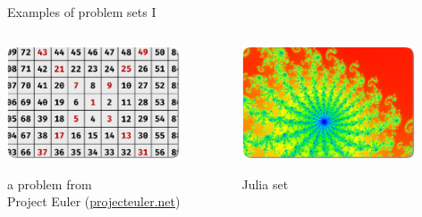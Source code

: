 \documentclass[svgnames]{beamer}
\begin{document}
\begin{frame}{Examples of problem sets I}

 \vspace{-0.7truecm}
 \begin{columns}[t]
  \begin{column}{0.5\textwidth}
   \begin{center}
    \includegraphics[width=0.8\textwidth]{spiral}

    a problem from\\[-0.05truecm] Project Euler (\url{projecteuler.net})
   \end{center}
  \end{column}%
  \begin{column}{0.5\textwidth}
   \begin{center}
    \includegraphics[width=0.8\textwidth]{julia}

    Julia set
   \end{center}
  \end{column}%
 \end{columns}


\end{frame}
\end{document}

